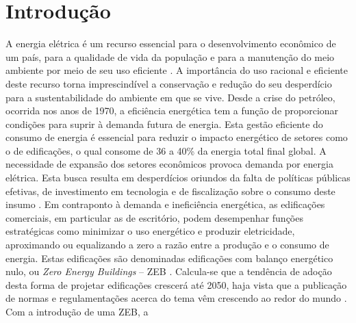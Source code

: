 \section{Introdução}
\begin{onehalfspace}
     A energia elétrica é um recurso essencial para o desenvolvimento econômico de um país, 
     para a qualidade  de  vida  da  população  e para  a  manutenção  do meio  ambiente
     por  meio  de  seu  uso eficiente \cite{Fonseca2016}. A importância do uso racional
     e eficiente deste recurso torna imprescindível a conservação e redução do seu 
     desperdício para a sustentabilidade do ambiente em que se vive.\vspace*{0.3cm} \newline Desde  a  crise  do  
     petróleo,  ocorrida nos  anos  de 1970,  a eficiência  energética tem  a  função  de 
     proporcionar  condições  para  suprir  à  demanda  futura  de  energia.  Esta  gestão  
     eficiente  do consumo  de  energia  é  essencial  para  reduzir  o  impacto  energético  
     de  setores  como  o  de edificações, o qual consome de 36 a 40\% da energia total final
     global. A necessidade de expansão dos   setores   econômicos   provoca   demanda   por
     energia   elétrica.   Esta   busca   resulta   em desperdícios oriundos da falta de 
     políticas públicas efetivas, de investimento em tecnologia e de fiscalização   sobre 
     o   consumo   deste   insumo \cite{InternationalEnergyAgency-IEA2019,InternationalEnergyAgency-IEA2019a,
     UnitedNationsEnvironmentProgramme-UNEP2019,UnitedNations2017}.\vspace*{0.3cm} \newline
     Em contraponto à demanda e ineficiência energética, as edificações comerciais, em particular 
     as de  escritório,  podem  desempenhar  funções  estratégicas  como  minimizar  o  uso  
     energético  e produzir eletricidade, aproximando ou equalizando a zero a razão entre a 
     produção e o consumo de energia. Estas edificações são denominadas edificações com balanço 
     energético nulo, ou \textit{Zero Energy Buildings} – ZEB \cite{Crawley2009,Torcellini2006,Kurnitski2011,Kurnitski2011a,Torcellini2015}.\vspace*{0.3cm} \newline
     Calcula-se  que  a  tendência  de  adoção  desta  forma  de  projetar edificações crescerá 
     até 2050, haja vista que a publicação de normas e regulamentações acerca do tema vêm 
     crescendo ao redor do mundo \cite{UnitedNationsEnvironmentProgramme-UNEP2019}. Com  a  introdução  de  uma  ZEB,  a  

\end{onehalfspace}
